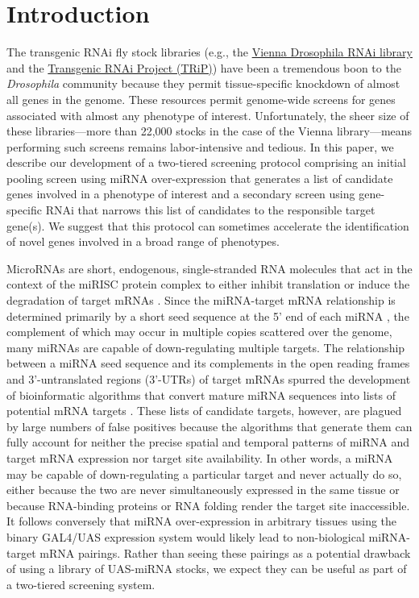 \section*{Introduction}

The transgenic RNAi fly stock libraries (e.g., the \href{http://stockcenter.vdrc.at/control/rnailibrary}{Vienna Drosophila RNAi library} \cite{Oppel_Scheiblauer_et_al__2007} and the \href{http://www.flyrnai.org/TRiP-HOME.html}{Transgenic RNAi Project (TRiP)}) have been a tremendous boon to the \emph{Drosophila} community because they permit tissue-specific knockdown of almost all genes in the genome.
These resources permit genome-wide screens for genes associated with almost any phenotype of interest.
Unfortunately, the sheer size of these libraries---more than 22,000 stocks in the case of the Vienna library---means performing such screens remains labor-intensive and tedious.
In this paper, we describe our development of a two-tiered screening protocol comprising an initial pooling screen using miRNA over-expression that generates a list of candidate genes involved in a phenotype of interest and a secondary screen using gene-specific RNAi that narrows this list of candidates to the responsible target gene(s).
We suggest that this protocol can sometimes accelerate the identification of novel genes involved in a broad range of phenotypes.

MicroRNAs are short, endogenous, single-stranded RNA molecules that act in the context of the miRISC protein complex to either inhibit translation or induce the degradation of target mRNAs \cite{BARTEL_2004}.
Since the miRNA-target mRNA relationship is determined primarily by a short seed sequence at the 5' end of each miRNA \cite{ones-Rhoades_Bartel_Burge_2003,Lai_2002}, the complement of which may occur in multiple copies scattered over the genome, many miRNAs are capable of down-regulating multiple targets.
The relationship between a miRNA seed sequence and its complements in the open reading frames and 3'-untranslated regions (3'-UTRs) of target mRNAs spurred the development of bioinformatic algorithms that convert mature miRNA sequences into lists of potential mRNA targets \cite{Rajewsky_2006}.
These lists of candidate targets, however, are plagued by large numbers of false positives because the algorithms that generate them can fully account for neither the precise spatial and temporal patterns of miRNA and target mRNA expression nor target site availability.
In other words, a miRNA may be capable of down-regulating a particular target and never actually do so, either because the two are never simultaneously expressed in the same tissue or because RNA-binding proteins or RNA folding render the target site inaccessible.
It follows conversely that miRNA over-expression in arbitrary tissues using the binary GAL4/UAS expression system would likely lead to non-biological miRNA-target mRNA pairings.
Rather than seeing these pairings as a potential drawback of using a library of UAS-miRNA stocks, we expect they can be useful as part of a two-tiered screening system.


